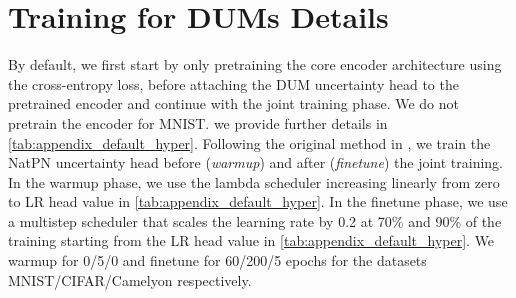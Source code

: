\section{Training for DUMs Details}
\label{subsec:appendix_training}

By default, we first start by only pretraining the core encoder architecture using the cross-entropy loss, before attaching the DUM uncertainty head to the pretrained encoder and continue with the joint training phase. We do not pretrain the encoder for MNIST. we provide further details in \cref{tab:appendix_default_hyper}.
Following the original method in \cite{charpentier2022natpn}, we train the NatPN uncertainty head before (\textit{warmup}) and after (\textit{finetune}) the joint training. In the warmup phase, we use the lambda scheduler increasing linearly from zero to LR head value in \cref{tab:appendix_default_hyper}. In the finetune phase, we use a multistep scheduler that scales the learning rate by 0.2 at 70\% and 90\% of the training starting from the LR head value in \cref{tab:appendix_default_hyper}. We warmup for 0/5/0 and finetune for 60/200/5 epochs for the datasets MNIST/CIFAR/Camelyon respectively.


